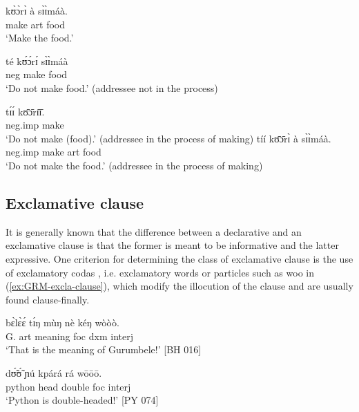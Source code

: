 \begin{multicols}{2}
 
 

\ea\label{ex:GRM-neg-fut-pres}

 \ea\label{ex:GRM-neg-fut}
\gll  kʊ̀ɔ̀rɪ̀ à sɪ̀ɪ̀máà.\\
  make {\sc art} food\\
 \glt `Make the food.'
 
 
 \ex 
\gll  té kʊ́ɔ́rɪ́ sɪ̀ɪ̀máà\\
{\sc neg}  make food\\
 \glt `Do not make food.' (addressee not in the process)
 \vfill
 \columnbreak
 
  \ex \label{ex:GRM-neg-pres}
  \gll  tɪ́ɪ́ kʊ̄ɔ̄rɪ̄ɪ̄.\\
 {\sc neg.imp}  make\\
 \glt `Do not make (food).' (addressee in the process of making)
   \ex 
  \gll  tíí kʊ̄ɔ̄rɪ̀  à sɪ̀ɪ̀máà.\\
 {\sc neg.imp}  make {\sc art}  food\\
 \glt `Do not make the food.' (addressee in the process of making)
\z
\z

\end{multicols}



\subsection{Exclamative clause}
\label{sec:GRM-excla-clause}

It is generally known that the difference between a declarative and an exclamative  clause is 
that the former is meant to be informative and the latter expressive. One criterion for determining 
the class of exclamative clause is the use of  exclamatory codas  \citep[242]{alla14}, i.e.  
exclamatory words or particles such as  {\sls woo} in (\ref{ex:GRM-excla-clause}), which modify the 
illocution of the clause and are usually found clause-finally.

 \ea\label{ex:GRM-excla-clause}
\ea\label{ex:GRM-excla-clause-1}
\gll  bɛ̀lɛ̀ɛ́ tɪ́ŋ mùŋ nè kéŋ wòòò. \\
G. {\sc art} meaning {\sc foc} {\sc dxm}  {\sc interj}\\
\glt `That is the meaning of Gurumbele!' [BH 016]

\ex\label{ex:GRM-excla-clause-2}
\gll dʊ̃́ʊ̃́ ɲú kpárá rá wōōō.\\
python head double {\sc foc} {\sc interj}\\
\glt `Python is double-headed!'  [PY 074]


